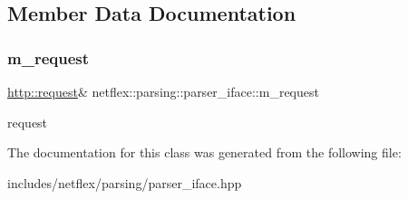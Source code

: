 \subsection{Member Data Documentation}
\mbox{\label{classnetflex_1_1parsing_1_1parser__iface_a893c1abb768c2884318d7f35d315621b}} 
\subsubsection{\texorpdfstring{m\+\_\+request}{m\_request}}
{\footnotesize\ttfamily \hyperlink{classnetflex_1_1http_1_1request}{http\+::request}\& netflex\+::parsing\+::parser\+\_\+iface\+::m\+\_\+request\hspace{0.3cm}{\ttfamily [protected]}}

request 

The documentation for this class was generated from the following file\+:\begin{DoxyCompactItemize}
\item 
includes/netflex/parsing/parser\+\_\+iface.\+hpp\end{DoxyCompactItemize}
